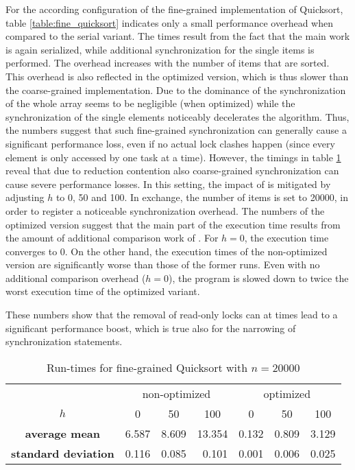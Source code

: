 For the according configuration of the fine-grained implementation of Quicksort, table \ref{table:fine_quicksort} indicates only a small performance overhead when compared to the serial variant. The times result from the fact that the main work is again serialized, while additional synchronization for the single items is performed. The overhead increases with the number of items that are sorted. This overhead is also reflected in the optimized version, which is thus slower than the coarse-grained implementation. Due to the dominance of  the synchronization of the whole array seems to be negligible (when optimized) while the synchronization of the single elements noticeably decelerates the algorithm. Thus, the numbers suggest that such fine-grained synchronization can generally cause a significant performance loss, even if no actual lock clashes happen (since every element is only accessed by one task at a time). However, the timings in table \ref{table:fine_quicksort2} reveal that due to reduction contention also coarse-grained synchronization can cause severe performance losses. In this setting, the impact of  is mitigated by adjusting $h$ to 0, 50 and 100. In exchange, the number of items is set to 20000, in order to register a noticeable synchronization overhead. The numbers of the optimized version suggest that the main part of the execution time results from the amount of additional comparison work of . For $h = 0$, the execution time converges to 0. On the other hand, the execution times of the non-optimized version are significantly worse than those of the former runs. Even with no additional comparison overhead ($h = 0$), the program is slowed down to twice the worst execution time of the optimized variant. 

These numbers show that the removal of read-only locks can at times lead to a significant performance boost, which is true also for the narrowing of synchronization statements.

\begin{table}[h!]
\begin{center}
\begin{tabular}{c |c|c|c||c|c|c|}
  \multicolumn{1}{c}{} & \multicolumn{3}{c}{non-optimized} & \multicolumn{3}{c}{optimized}\\ \cline{2-7}
  $h$ & 0 & 50 & 100 & 0 & 50 & 100\\ \cline{2-7}
  \textbf{average mean} & 6.587 & 8.609 & 13.354 & 0.132 & 0.809 & 3.129	\\ \cline{2-7}
  \textbf{standard deviation} & 0.116 & 0.085 & \multicolumn{1}{r||}{0.101} & 0.001 & 0.006 & 0.025\\ \cline{2-7}
\end{tabular}
\caption{Run-times for fine-grained Quicksort with $n = 20000$}
\label{table:fine_quicksort2}
\end{center}
\end{table}

